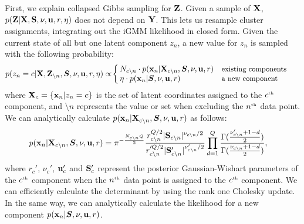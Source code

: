 First, we explain collapsed Gibbs sampling for $\mathbf{Z}$.
Given a sample of $\mathbf{X}$, $p(\mathbf{Z} | \mathbf{X}, \mathbf{S}, \nu, {\bf{u}}, r, \eta)$ does not depend on $\mathbf{Y}$.
This lets us resample cluster assignments, integrating out the iGMM likelihood in closed form.
Given the current state of all but one latent component $z_{n}$, a new value for $z_{n}$ is sampled with the following probability:
%
\begin{align}
p(z_{n}=c|\mathbf{X},\mathbf{Z}_{\setminus n},\bm{S},\nu,{\bf{u}},r,\eta)
 & \propto\!
\left\{
\begin{array}{ll}
\!\!N_{c\setminus n}\cdot p({\bf{x}}_{n}|\mathbf{X}_{c\setminus n},\bm{S},\nu,{\bf{u}},r) & \text{{\small existing components}}\\
\!\!\eta\cdot p({\bf{x}}_{n}|\bm{S},\nu,{\bf{u}},r) & \text{{\small a new component}}
\end{array}
\right.
\label{eq:gibbs}
\end{align}
%
where $\mathbf{X}_{c}=\{{\bf{x}}_{n}|z_{n}=c\}$ 
is the set of latent coordinates assigned to the $c^{\text{\tiny th}}$ component,
and $\setminus n$ represents the value or set
when excluding the $n^{\text{\tiny th}}$ data point.
We can analytically calculate $p({\bf{x}}_{n}|\mathbf{X}_{c\setminus n},\bm{S},\nu,{\bf{u}},r)$
as follows:
%
\begin{align}
p({\bf{x}}_{n}|\mathbf{X}_{c\setminus n},\bm{S},\nu,{\bf{u}},r)
 & =\pi^{-\frac{N_{c\setminus n}Q}{2}}\frac{r_{c\setminus n}^{Q/2}|\mathbf{S}_{c\setminus n}|^{\nu_{c\setminus n}/2}}{r_{c\setminus n}'^{Q/2}|\mathbf{S}_{c\setminus n}'|^{\nu_{c\setminus n}'/2}}\prod_{d=1}^{Q}\frac{\Gamma(\frac{\nu_{c\setminus n}'+1-d}{2})}{\Gamma(\frac{\nu_{c\setminus n}+1-d}{2})},
\end{align}
%
where $r_{c}'$, $\nu_{c}'$, ${\bf{u}}_{c}'$ and $\mathbf{S}_{c}'$ represent the posterior Gaussian-Wishart parameters of the $c^{\text{\tiny th}}$ component when the $n^{\text{\tiny th}}$ data point is assigned to the $c^{\text{\tiny th}}$ component.
We can efficiently calculate the determinant by using the rank one Cholesky update.
In the same way, we can analytically calculate the likelihood for a new component $p({\bf{x}}_{n}|\bm{S},\nu,{\bf{u}},r)$.

